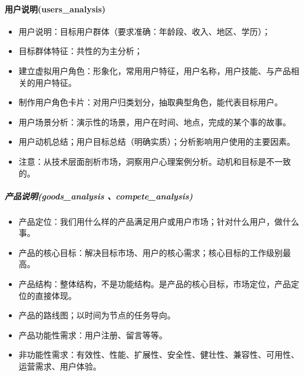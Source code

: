 \documentclass[letterpaper,11pt,english]{sphinxmanual}
\begin{document}
\paragraph{用户说明(users\_analysis)}
\label{\detokenize{chapter_skill/MRD:users-analysis}}\begin{itemize}
\item {} 
用户说明：目标用户群体（要求准确：年龄段、收入、地区、学历）；

\item {} 
目标群体特征：共性的为主分析；

\item {} 
建立虚拟用户角色：形象化，常用用户特征，用户名称，用户技能、与产品相关的用户特征。

\item {} 
制作用户角色卡片：对用户归类划分，抽取典型角色，能代表目标用户。

\item {} 
用户场景分析：演示性的场景，用户在时间、地点，完成的某个事的故事。

\item {} 
用户动机总结；用户目标总结（明确实质）；分析影响用户使用的主要因素。

\item {} 
注意：从技术层面剖析市场，洞察用户心理案例分析。动机和目标是不一致的。

\end{itemize}


\subparagraph{产品说明(goods\_analysis 、compete\_analysis)}
\label{\detokenize{chapter_skill/MRD:goods-analysis-compete-analysis}}\begin{itemize}
\item {} 
产品定位：我们用什么样的产品满足用户或用户市场；针对什么用户，做什么事。

\item {} 
产品的核心目标：解决目标市场、用户的核心需求；核心目标的工作级别最高。

\item {} 
产品结构：整体结构，不是功能结构。是产品的核心目标，市场定位，产品定位的直接体现。

\item {} 
产品的路线图；以时间为节点的任务导向。

\item {} 
产品功能性需求：用户注册、留言等等。

\item {} 
非功能性需求：有效性、性能、扩展性、安全性、健壮性、兼容性、可用性、运营需求、用户体验。

\end{itemize}
\end{document}
